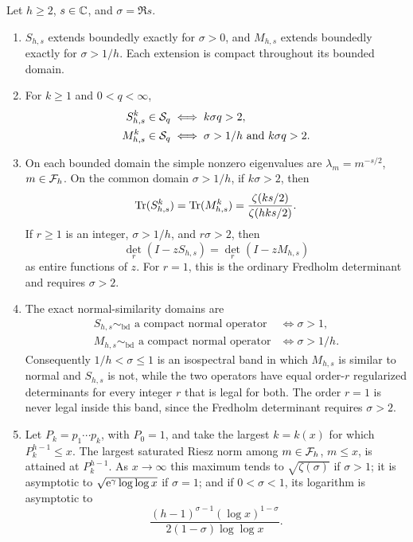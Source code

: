 \begin{theorem}
\label{thm:main}
Let $h\ge2$, $s\in\mathbb C$, and $\sigma=\Re s$.
\begin{enumerate}[label=\textup{(\roman*)}]
  \item $S_{h,s}$ extends boundedly exactly for $\sigma>0$, and
  $M_{h,s}$ extends boundedly exactly for $\sigma>1/h$.  Each extension is
  compact throughout its bounded domain.

  \item For $k\ge1$ and $0<q<\infty$,
  \begin{align*}
    S_{h,s}^{k}\in\mathcal S_q
      &\iff k\sigma q>2,\\
    M_{h,s}^{k}\in\mathcal S_q
      &\iff \sigma>1/h\ \text{and}\ k\sigma q>2.
  \end{align*}

  \item On each bounded domain the simple nonzero eigenvalues are
  $\lambda_m=m^{-s/2}$, $m\in\mathcal F_h$.  On the common domain
  $\sigma>1/h$, if $k\sigma>2$, then
  \begin{equation}
    \operatorname{Tr}(S_{h,s}^{k})=\operatorname{Tr}(M_{h,s}^{k})
      =\frac{\zeta(ks/2)}{\zeta(hks/2)}.
    \label{eq:intro-trace}
  \end{equation}
  If $r\ge1$ is an integer, $\sigma>1/h$, and $r\sigma>2$, then
  \begin{equation}
    \det_r(I-zS_{h,s})=\det_r(I-zM_{h,s})
    \label{eq:intro-det}
  \end{equation}
  as entire functions of $z$.  For $r=1$, this is the ordinary Fredholm
  determinant and requires $\sigma>2$.

  \item The exact normal-similarity domains are
  \begin{align*}
    S_{h,s}\sim_{\mathrm{bd}}\text{ a compact normal operator}
      &\iff \sigma>1,\\
    M_{h,s}\sim_{\mathrm{bd}}\text{ a compact normal operator}
      &\iff \sigma>1/h.
  \end{align*}
  Consequently $1/h<\sigma\le1$ is an isospectral band in which
  $M_{h,s}$ is similar to normal and $S_{h,s}$ is not, while the two
  operators have equal order-$r$ regularized determinants for every integer
  $r$ that is legal for both.  The order $r=1$ is never legal inside this
  band, since the Fredholm determinant requires $\sigma>2$.

  \item Let $P_k=p_1\cdots p_k$, with $P_0=1$, and take the largest
  $k=k(x)$ for which $P_k^{h-1}\le x$.  The largest saturated Riesz norm
  among $m\in\mathcal F_h$, $m\le x$, is attained at $P_k^{h-1}$.  As
  $x\to\infty$ this maximum tends to $\sqrt{\zeta(\sigma)}$ if
  $\sigma>1$; it is asymptotic to
  $\sqrt{\mathrm e^\gamma\log\log x}$ if $\sigma=1$; and if
  $0<\sigma<1$, its logarithm is asymptotic to
  \begin{equation}
    \frac{(h-1)^{\sigma-1}(\log x)^{1-\sigma}}
         {2(1-\sigma)\log\log x}.
    \label{eq:intro-primorial}
  \end{equation}


\end{enumerate}
\end{theorem}
